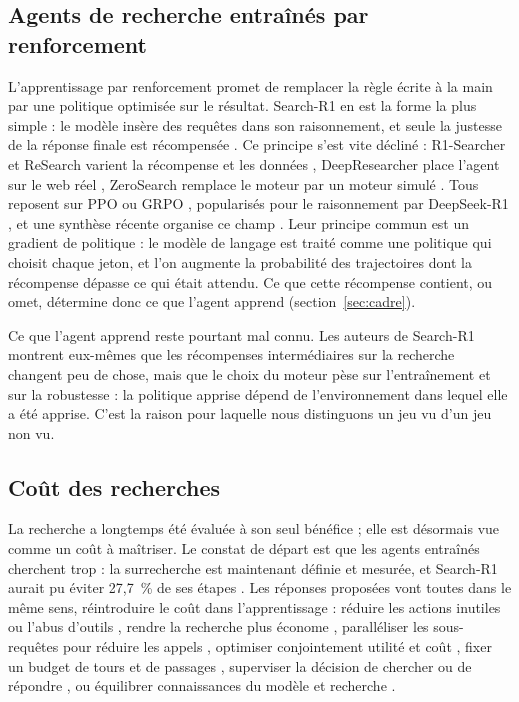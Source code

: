\subsection{Agents de recherche entraînés par renforcement}
L'apprentissage par renforcement promet de remplacer la règle écrite à la main par une politique optimisée sur le résultat. Search-R1 en est la forme la plus simple : le modèle insère des requêtes dans son raisonnement, et seule la justesse de la réponse finale est récompensée \citep{jin2025search}. Ce principe s'est vite décliné : R1-Searcher et ReSearch varient la récompense et les données \citep{song2025r1,chen2025research}, DeepResearcher place l'agent sur le web réel \citep{zheng2025deepresearcher}, ZeroSearch remplace le moteur par un moteur simulé \citep{sun2025zerosearch}. Tous reposent sur PPO \citep{schulman2017proximal} ou GRPO \citep{shao2024deepseekmath}, popularisés pour le raisonnement par DeepSeek-R1 \citep{deepseekai2025deepseek}, et une synthèse récente organise ce champ \citep{lin2025comprehensive}. Leur principe commun est un gradient de politique : le modèle de langage est traité comme une politique qui choisit chaque jeton, et l'on augmente la probabilité des trajectoires dont la récompense dépasse ce qui était attendu. Ce que cette récompense contient, ou omet, détermine donc ce que l'agent apprend (section~\ref{sec:cadre}).

Ce que l'agent apprend reste pourtant mal connu. Les auteurs de Search-R1 montrent eux-mêmes que les récompenses intermédiaires sur la recherche changent peu de chose, mais que le choix du moteur pèse sur l'entraînement et sur la robustesse \citep{jin2025empirical} : la politique apprise dépend de l'environnement dans lequel elle a été apprise. C'est la raison pour laquelle nous distinguons un jeu vu d'un jeu non vu.

\subsection{Coût des recherches}
La recherche a longtemps été évaluée à son seul bénéfice ; elle est désormais vue comme un coût à maîtriser. Le constat de départ est que les agents entraînés cherchent trop : la surrecherche est maintenant définie et mesurée, et Search-R1 aurait pu éviter 27,7~\% de ses étapes \citep{wu2025search}. Les réponses proposées vont toutes dans le même sens, réintroduire le coût dans l'apprentissage : réduire les actions inutiles \citep{wang2025acting} ou l'abus d'outils \citep{chen2026learning}, rendre la recherche plus économe \citep{sha2025sem}, paralléliser les sous-requêtes pour réduire les appels \citep{zhao2025parallelsearch}, optimiser conjointement utilité et coût \citep{mei2025ai}, fixer un budget de tours et de passages \citep{sun2026adarag}, superviser la décision de chercher ou de répondre \citep{sun2026search}, ou équilibrer connaissances du modèle et recherche \citep{lin2025adasearch}.

